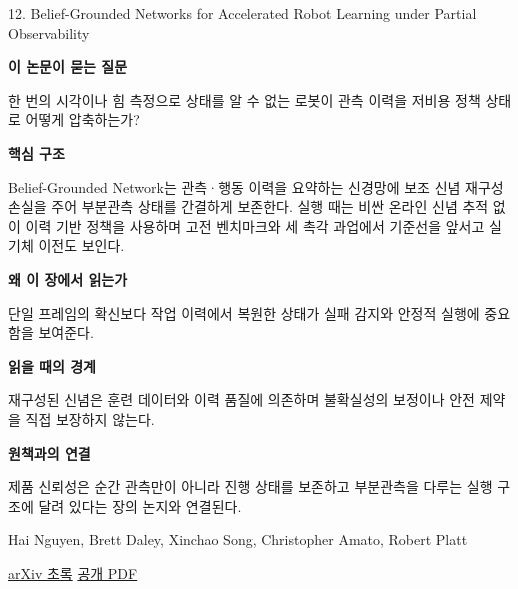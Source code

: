 \documentclass[11pt,openany]{book}
\begin{document}
\begin{termcard}{12. Belief-Grounded Networks for Accelerated Robot Learning under Partial Observability}

\par

\medskip

{\sffamily\bfseries\color{deepblue} 이 논문이 묻는 질문}\par

한 번의 시각이나 힘 측정으로 상태를 알 수 없는 로봇이 관측 이력을 저비용 정책 상태로 어떻게 압축하는가?

\smallskip

{\sffamily\bfseries\color{deepblue} 핵심 구조}\par

Belief-Grounded Network는 관측·행동 이력을 요약하는 신경망에 보조 신념 재구성 손실을 주어 부분관측 상태를 간결하게 보존한다. 실행 때는 비싼 온라인 신념 추적 없이 이력 기반 정책을 사용하며 고전 벤치마크와 세 촉각 과업에서 기준선을 앞서고 실기체 이전도 보인다.

\smallskip

{\sffamily\bfseries\color{deepblue} 왜 이 장에서 읽는가}\par

단일 프레임의 확신보다 작업 이력에서 복원한 상태가 실패 감지와 안정적 실행에 중요함을 보여준다.

\smallskip

{\sffamily\bfseries\color{coral} 읽을 때의 경계}\par

재구성된 신념은 훈련 데이터와 이력 품질에 의존하며 불확실성의 보정이나 안전 제약을 직접 보장하지 않는다.

\smallskip

{\sffamily\bfseries\color{teal} 원책과의 연결}\par

제품 신뢰성은 순간 관측만이 아니라 진행 상태를 보존하고 부분관측을 다루는 실행 구조에 달려 있다는 장의 논지와 연결된다.

\medskip

{\footnotesize\color{muted} Hai Nguyen, Brett Daley, Xinchao Song, Christopher Amato, Robert Platt\par

\href{https://arxiv.org/abs/2010.09170}{arXiv 초록} \quad \href{https://arxiv.org/pdf/2010.09170}{공개 PDF}\par}

\end{termcard}
\end{document}
